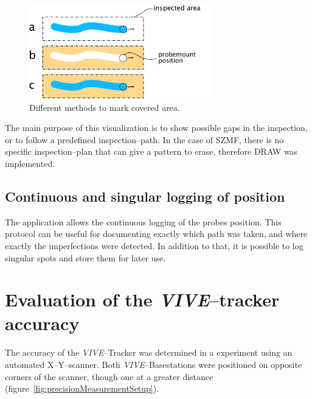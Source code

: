 \documentclass{VRARWorkshop}
\begin{document}
\begin{figure}[h!]
    \begin{center}
        \includegraphics[width=79mm]{images/DrawVsErase}
        \caption{\label{fig:DrawVsErase} Different methods to mark covered area.}
    \end{center}
\end{figure}

The main purpose of this visualization is to show possible gaps in the inspection, or to follow a predefined inspection--path.
In the case of SZMF, there is no specific inspection--plan that can give a pattern to erase, therefore DRAW was implemented.

\subsection{Continuous and singular logging of position}
The application allows the continuous logging of the probes position.
This protocol can be useful for documenting exactly which path was taken, and where exactly the imperfections were detected.
In addition to that, it is possible to log singular spots and store them for later use.

\section{Evaluation of the \textit{VIVE}--tracker accuracy}
The accuracy of the \textit{VIVE}--Tracker was determined in a experiment using an automated X--Y--scanner.
Both \textit{VIVE}--Basestations were positioned on opposite corners of the scanner, though one at a greater distance (figure~\ref{fig:precisionMeasurementSetup}).
\end{document}
